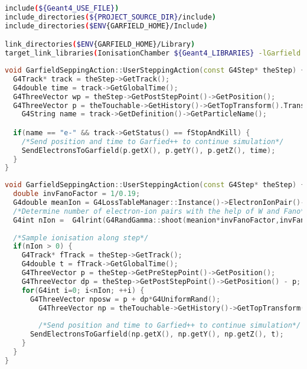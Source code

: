 \documentclass[preprint,12pt,sort&compress]{elsarticle}
\begin{document}
\begin{lstlisting}[label=code_cmake, caption=CMakeList.txt., language=bash]
include(${Geant4_USE_FILE})
include_directories(${PROJECT_SOURCE_DIR}/include)
include_directories($ENV{GARFIELD_HOME}/Include)

link_directories($ENV{GARFIELD_HOME}/Library)
target_link_libraries(IonisationChamber ${Geant4_LIBRARIES} -lGarfield -lgfortran )
\end{lstlisting}


\begin{lstlisting}[label=code_StoreBeforeKill,caption=Storing of last positions of electron tracks in  UserSteppingAction to generate electron-ion pairs for Garfield++.,language=C++]
void GarfieldSeppingAction::UserSteppingAction(const G4Step* theStep) {
  G4Track* track = theStep->GetTrack();
  G4double time = track->GetGlobalTime();
  G4ThreeVector wp = theStep->GetPostStepPoint()->GetPosition();
  G4ThreeVector p = theTouchable->GetHistory()->GetTopTransform().TransformPoint(wp);
	G4String name = track->GetDefinition()->GetParticleName();

  if(name == "e-" && track->GetStatus() == fStopAndKill) {
    /*Send position and time to Garfied++ to continue simulation*/
    SendElectronsToGarfield(p.getX(), p.getY(), p.getZ(), time);
  }
}
\end{lstlisting} 

\newpage

\begin{lstlisting}[label=code_SampleIonsAlongStep,caption=Use of MeanNumberOfIonsAlongStep() in UserSteppingAction to generate electron-ion pairs for Garfield++.,language=C++]
void GarfieldSeppingAction::UserSteppingAction(const G4Step* theStep) {
  double invFanoFactor = 1/0.19;
  G4double meanIon = G4LossTableManager::Instance()->ElectronIonPair()->MeanNumberOfIonsAlongStep(theStep);
  /*Determine number of electron-ion pairs with the help of W and Fano*/
  G4int nIon =  G4lrint(G4RandGamma::shoot(meanion*invFanoFactor,invFanoFactor));
 
  /*Sample ionisation along step*/
  if(nIon > 0) {
    G4Track* fTrack = theStep->GetTrack();
    G4double t = fTrack->GetGlobalTime();  
    G4ThreeVector p = theStep->GetPreStepPoint()->GetPosition();
    G4ThreeVector dp = theStep->GetPostStepPoint()->GetPosition() - p;       
    for(G4int i=0; i<nIon; ++i) {
      G4ThreeVector nposw = p + dp*G4UniformRand();
	    G4ThreeVector np = theTouchable->GetHistory()->GetTopTransform().TransformPoint(nposw);
	        
	    /*Send position and time to Garfied++ to continue simulation*/
      SendElectronsToGarfield(np.getX(), np.getY(), np.getZ(), t);
    }
  }
}
\end{lstlisting} 
\end{document}
